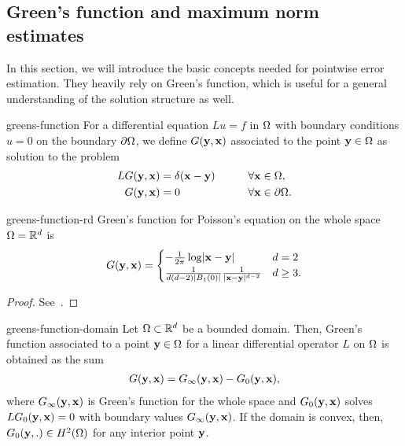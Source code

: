 \subsection{Green's function and maximum norm estimates}

\begin{intro}
  In this section, we will introduce the basic concepts needed for
  pointwise error estimation. They heavily rely on Green's function,
  which is useful for a general understanding of the solution
  structure as well.
\end{intro}

\begin{Definition}{greens-function}
  For a differential equation $Lu = f$ in $\Omega$ with boundary
  conditions $u=0$ on the boundary $\partial\Omega$, we define
   $G(\mathbf y,\mathbf x)$ associated to the point
  $\mathbf y\in\Omega$ as solution to the problem
  \begin{gather}
    \begin{aligned}
      L G(\mathbf y,\mathbf x) &= \delta(\mathbf x-\mathbf y)&\qquad\forall \mathbf x&\in\Omega,\\
      G(\mathbf y,\mathbf x) &= 0&\qquad\forall \mathbf x&\in\partial\Omega.
    \end{aligned}
  \end{gather}
\end{Definition}

\begin{Theorem}{greens-function-rd}
  Green's function for Poisson's equation on the whole space
  $\Omega=\mathbb R^d$ is
  \begin{gather}
    G(\mathbf y,\mathbf x) =
    \begin{cases}
      - \frac1{2\pi} \log \lvert\mathbf x-\mathbf y\rvert & d=2\\
      \frac1{d(d-2)\lvert B_1(0)\rvert} \frac1{\lvert\mathbf x-\mathbf y\rvert^{d-2}} & d\ge3.
    \end{cases}
  \end{gather}
\end{Theorem}

\begin{proof}
  See~\cite[Section 2.2]{Evans98}.
\end{proof}

\begin{Lemma}{greens-function-domain}
  Let $\Omega\subset \mathbb R^d$ be a bounded domain. Then, Green's
  function associated to a point $\mathbf y\in\Omega$ for a linear
  differential operator $L$ on $\Omega$ is obtained as the sum
  \begin{gather}
    G(\mathbf y,\mathbf x) = G_\infty(\mathbf y,\mathbf x) - G_0(\mathbf y,\mathbf x),
  \end{gather}
  where $G_\infty(\mathbf y,\mathbf x)$ is Green's function for the whole space
  and $G_0(\mathbf y,\mathbf x)$ solves $LG_0(\mathbf y,\mathbf x)=0$ with boundary values
  $G_\infty(\mathbf y,\mathbf x)$. If the domain is convex, then,
  $G_0(\mathbf y,.)\in H^2(\Omega)$ for any interior point $\mathbf y$.
\end{Lemma}

